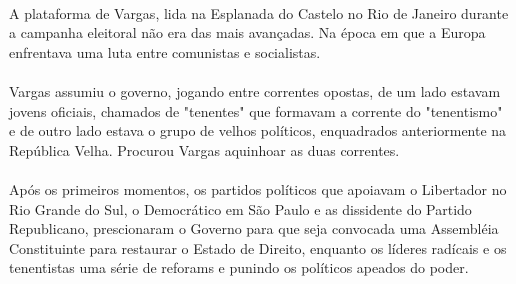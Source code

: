 \paragraph{}
A plataforma de Vargas, lida na Esplanada do Castelo no Rio de Janeiro durante a campanha eleitoral não era das mais avançadas. Na época em que a Europa enfrentava uma luta entre comunistas e socialistas.
\paragraph{}
Vargas assumiu o governo, jogando entre correntes opostas, de um lado estavam jovens oficiais, chamados de "tenentes" que formavam a corrente do "tenentismo" e de outro lado estava o grupo de velhos políticos, enquadrados anteriormente na República Velha. Procurou Vargas aquinhoar as duas correntes.
\paragraph{}
Após os primeiros momentos, os partidos políticos que apoiavam o Libertador no Rio Grande do Sul, o Democrático em São Paulo e as dissidente do Partido Republicano, prescionaram o Governo para que seja convocada uma Assembléia Constituinte para restaurar o Estado de Direito, enquanto os líderes radícais e os tenentistas uma série de reforams e punindo os políticos apeados do poder.



 
